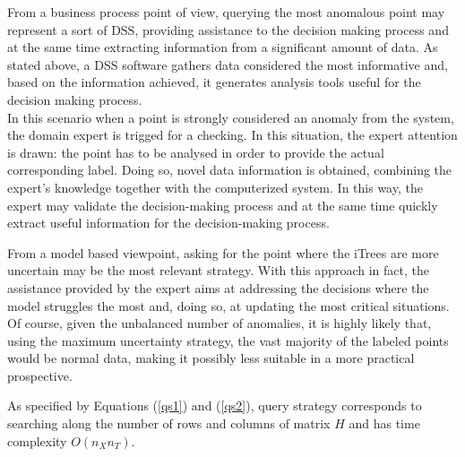 From a business process point of view, querying the most anomalous point may represent a sort of DSS, providing assistance to the decision making process and at the same time extracting information from a significant amount of data.  As stated above, a DSS software gathers data considered the most informative and, based on the information achieved, it generates analysis tools useful for the decision making process. 
\\In this scenario when a point is strongly considered an anomaly from the system, the domain expert is trigged for a checking. In this situation, the expert attention is drawn: the point has to be analysed in order to provide the actual corresponding label. Doing so, novel data information is obtained, combining the expert's knowledge together with the computerized system. In this way, the expert may validate the decision-making process and at the same time quickly extract useful information for the decision-making process. 

From a model based viewpoint, asking for the point where the iTrees are more uncertain may be the most relevant strategy. With this approach in fact, the assistance provided by the expert aims at addressing the decisions where the model struggles the most and, doing so, at updating the most critical situations. Of course, given the unbalanced number of anomalies, it is highly likely that, using the maximum uncertainty strategy, the vast majority of the labeled points would be normal data, making it possibly less suitable in a more practical prospective. 

As specified by Equations (\ref{qs1}) and (\ref{qs2}), \approach query strategy corresponds to searching along the number of rows and columns of matrix $H$ and has time complexity $O(n_X n_T)$.
